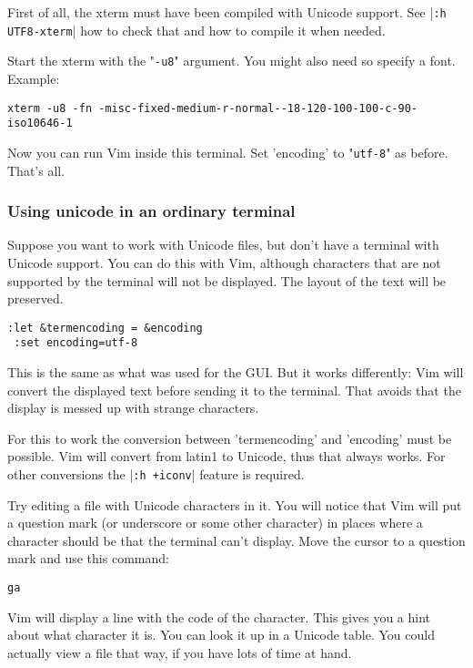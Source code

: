 First of all, the xterm must have been compiled with Unicode support.
See |\verb!:h UTF8-xterm!| how to check that and how to compile it when needed.

Start the xterm with the "\verb!-u8!" argument.
You might also need so specify a font.
Example:

\begin{Verbatim}[samepage=true]
   xterm -u8 -fn -misc-fixed-medium-r-normal--18-120-100-100-c-90-iso10646-1
\end{Verbatim}

Now you can run Vim inside this terminal.
Set 'encoding' to "\verb!utf-8!" as before.
That's all.

\subsubsection{Using unicode in an ordinary terminal}
Suppose you want to work with Unicode files, but don't have a terminal with Unicode support.
You can do this with Vim, although characters that are not supported by the terminal will not be displayed.
The layout of the text will be preserved. 

\begin{Verbatim}[samepage=true]
 :let &termencoding = &encoding
 :set encoding=utf-8
\end{Verbatim}

This is the same as what was used for the GUI.
But it works differently: Vim will convert the displayed text before sending it to the terminal.
That avoids that the display is messed up with strange characters.

For this to work the conversion between 'termencoding' and 'encoding' must be possible.
Vim will convert from latin1 to Unicode, thus that always works.
For other conversions the |\verb!:h +iconv!| feature is required.

Try editing a file with Unicode characters in it.
You will notice that Vim will put a question mark (or underscore or some other character) in places where a character should be that the terminal can't display.
Move the cursor to a question mark and use this command:

\begin{Verbatim}[samepage=true]
 ga
\end{Verbatim}

Vim will display a line with the code of the character.
This gives you a hint about what character it is.
You can look it up in a Unicode table.
You could actually view a file that way, if you have lots of time at hand.

